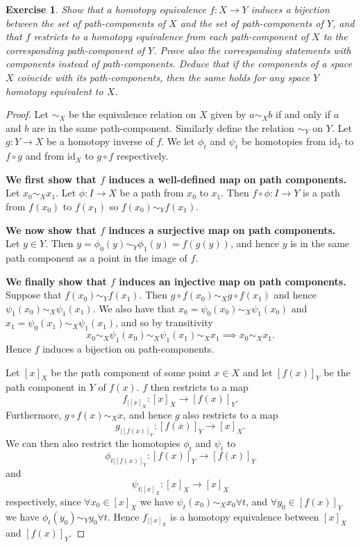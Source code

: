 \documentclass{article}
\newtheorem{exercise}[theorem]{Exercise}
\begin{document}
\begin{exercise}
Show that a homotopy equivalence $f:X\to Y$ induces a bijection between the set of path-components of $X$ and the set of path-components of $Y$, and that $f$ restricts to
a homotopy equivalence from each path-component of $X$ to the corresponding path-component of $Y$. Prove also the corresponding statements with components instead
of path-components. Deduce that if the components of a space $X$ coincide with its
path-components, then the same holds for any space $Y$ homotopy equivalent to $X$.
\end{exercise}
\begin{proof}
Let $\sim_X$ be the equivalence relation on $X$ given by $a\sim_X b$ if and only if $a$ and $b$ are in the same path-component. Similarly define the relation $\sim_Y$ on $Y$. Let $g:Y\to X$ be a homotopy inverse of $f$. We let $\phi_t$ and $\psi_t$ be homotopies from $\text{id}_Y$ to $f\circ g$ and from $\text{id}_X$ to $g\circ f$ respectively.


\textbf{We first show that $f$ induces a well-defined map on path components.}\\Let $x_0\sim_X x_1$. Let $\phi:I\to X$ be a path from $x_0$ to $x_1$. Then $f\circ\phi:I\to Y$ is a path from $f(x_0)$ to $f(x_1)$ so $f(x_0)\sim_Y f(x_1)$.

\textbf{We now show that $f$ induces a surjective map on path components.}\\Let $y\in Y$. Then $y=\phi_0(y)\sim_Y \phi_1(y)=f(g(y))$, and hence $y$ is in the same path component as a point in the image of $f$.

\textbf{We finally show that $f$ induces an injective map on path components.}\\ Suppose that $f(x_0)\sim_Yf(x_1)$. Then $g\circ f(x_0)\sim_X g\circ f(x_1)$ and hence $\psi_1(x_0)\sim_X\psi_1(x_1)$. We also have that $x_0=\psi_0(x_0)\sim_X\psi_1(x_0)$ and $x_1=\psi_0(x_1)\sim_X\psi_1(x_1)$, and so by transitivity\[x_0\sim_X\psi_1(x_0)\sim_X\psi_1(x_1)\sim_X x_1\implies x_0\sim_X x_1.\]Hence $f$ induces a bijection on path-components.\newline

Let $[x]_X$ be the path component of some point $x\in X$ and let $[f(x)]_Y$ be the path component in $Y$ of $f(x)$. $f$ then restricts to a map \[f_{|[x]_X}:[x]_X\to [f(x)]_Y.\] Furthermore, $g\circ f(x)\sim_X x$, and hence $g$ also restricts to a map \[g_{|[f(x)]_Y}:[f(x)]_Y\to[x]_X.\] We can then also restrict the homotopies $\phi_t$ and $\psi_t$ to \[\phi_{t|[f(x)]_Y}:[f(x)]_Y\to[f(x)]_Y\] and \[\psi_{t|[x]_X}:[x]_X\to[x]_X\] respectively, since $\forall x_0\in[x]_X$ we have $\psi_t(x_0)\sim_Xx_0\forall t$, and $\forall y_0\in[f(x)]_Y$ we have $\phi_t(y_0)\sim_Y y_0\forall t$. Hence $f_{|[x]_X}$ is a homotopy equivalence between $[x]_X$ and $[f(x)]_Y$.


\end{proof}
\end{document}
